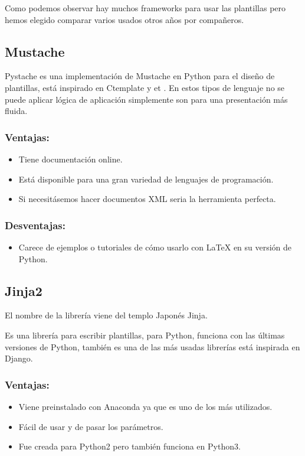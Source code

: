 Como podemos observar hay muchos frameworks para usar las plantillas pero hemos elegido comparar varios usados otros años por compañeros.
\subsection{Mustache}
Pystache es una implementación de Mustache en Python para el diseño de plantillas, está inspirado en Ctemplate \cite{GitHub:CTemplate} y et \cite{et}.
En estos tipos de lenguaje no se puede aplicar lógica de aplicación simplemente son para una presentación más fluida.

\subsubsection{Ventajas:}

\begin{itemize}
\item Tiene documentación online.
\item Está disponible para una gran variedad de lenguajes de programación.
\item Si necesitásemos hacer documentos XML seria la herramienta perfecta.
\end{itemize}

\subsubsection{Desventajas:}
\begin{itemize}
\item Carece de ejemplos o tutoriales de cómo usarlo con \LaTeX{} en su versión de Python.
\end{itemize}


\subsection{Jinja2}

El nombre de la librería viene del templo Japonés Jinja.

Es una librería para escribir plantillas, para Python, funciona con las últimas versiones de Python, también es una de las más usadas librerías está inspirada en Django.


\subsubsection{Ventajas:}
\begin{itemize}
\item Viene preinstalado con Anaconda ya que es uno de los más utilizados.
\item Fácil de usar y de pasar los parámetros.
\item Fue creada para Python2 pero también funciona en Python3.\end{itemize}

